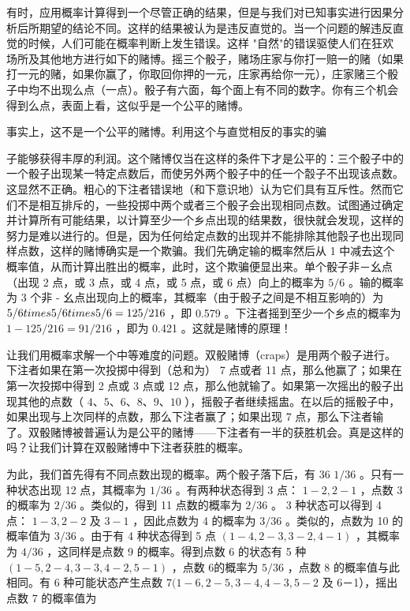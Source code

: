 有时，应用概率计算得到一个尽管正确的结果，但是与我们对已知事实进行因果分析后所期望的结论不同。这样的结果被认为是违反直觉的。当一个问题的解违反直觉的时候，人们可能在概率判断上发生错误。这样 "自然"的错误驱使人们在狂欢场所及其他地方进行如下的赌博。摇三个骰子，赌场庄家与你打一赔一的赌（如果打一元的赌，如果你赢了，你取回你押的一元，庄家再给你一元），庄家赌三个骰子中均不出现么点（一点）。骰子有六面，每个面上有不同的数字。你有三个机会得到么点，表面上看，这似乎是一个公平的赌博。

事实上，这不是一个公平的赌博。利用这个与直觉相反的事实的骗

子能够获得丰厚的利润。这个赌博仅当在这样的条件下才是公平的：三个骰子中的一个骰子出现某一特定点数后，而使另外两个骰子中的任一个䐨子不出现该点数。这显然不正确。粗心的下注者错误地（和下意识地）认为它们具有互斥性。然而它们不是相互排斥的，一些投掷中两个或者三个骰子会出现相同点数。试图通过确定并计算所有可能结果，以计算至少一个乡点出现的结果数，很快就会发现，这样的努力是难以进行的。但是，因为任何给定点数的出现并不能排除其他䐨子也出现同样点数，这样的赌博确实是一个欺骗。我们先确定输的概率然后从 1 中减去这个概率值，从而计算出胜出的概率，此时，这个欺骗便显出来。单个骰子非－幺点（出现 2 点，或 3 点，或 4 点，或 5 点，或 6 点）向上的概率为 $5 / 6$ 。输的概率为 3 个非 - 幺点出现向上的概率，其概率（由于骰子之间是不相互影响的）为 $5 / 6 \\times 5 / 6 \\times 5 / 6=125 / 216$ ，即 0.579 。下注者摇到至少一个乡点的概率为 $1-125 / 216=91 / 216$ ，即为 0.421 。这就是赌博的原理！

让我们用概率求解一个中等难度的问题。双骰赌博（craps）是用两个骰子进行。下注者如果在第一次投掷中得到（总和为） 7 点或者 11 点，那么他赢了；如果在第一次投掷中得到 2 点或 3 点或 12 点，那么他就输了。如果第一次摇出的骰子出现其他的点数（ $4 、 5 、 6 、 8 、 9 、 10$ ），摇骰子者继续摇盅。在以后的摇骰子中，如果出现与上次同样的点数，那么下注者赢了；如果出现 7 点，那么下注者输了。双骰赌博被普遍认为是公平的赌博——下注者有一半的获胜机会。真是这样的吗？让我们计算在双骰赌博中下注者获胜的概率。

为此，我们首先得有不同点数出现的概率。两个骰子落下后，有 36 $1 / 36$ 。只有一种状态出现 12 点，其概率为 $1 / 36$ 。有两种状态得到 3 点： $1-2,2-1$ ，点数 3 的概率为 $2 / 36$ 。类似的，得到 11 点数的概率为 $2 / 36$ 。 3 种状态可以得到 4 点： $1-3,2-2$ 及 $3-1$ ，因此点数为 4 的概率为 $3 / 36$ 。类似的，点数为 10 的概率值为 $3 / 36$ 。由于有 4 种状态得到 5 点 $(1-4,2-3,3-2,4-1)$ ，其概率为 $4 / 36$ ，这同样是点数 9 的概率。得到点数 6 的状态有 5 种 $(1-5,2-4,3-3,4-2,5-1)$ ，点数 6的概率为 $5 / 36$ ，点数 8 的概率值与此相同。有 6 种可能状态产生点数 $7(1-6,2-5,3-4,4-3,5-2$ 及 6－1），摇出点数 7 的概率值为

